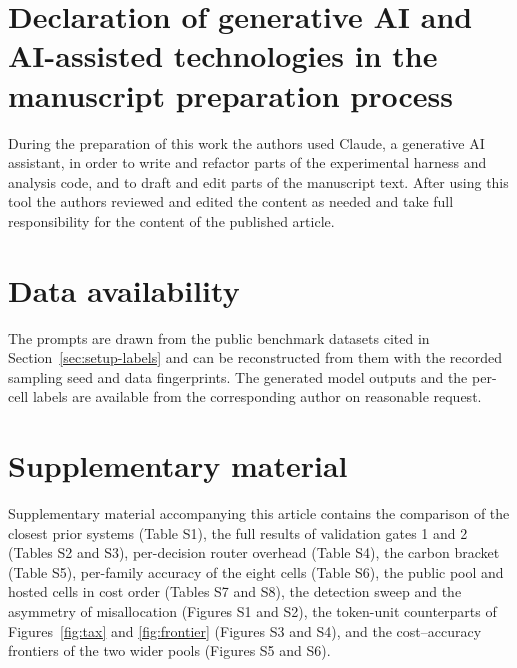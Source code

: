 
\section*{Declaration of generative AI and AI-assisted technologies in the
manuscript preparation process}

During the preparation of this work the authors used Claude, a generative AI
assistant, in order to write and refactor parts of the experimental harness
and analysis code, and to draft and edit parts of the manuscript text. After
using this tool the authors reviewed and edited the content as needed and
take full responsibility for the content of the published article.

\section*{Data availability}

The prompts are drawn from the public benchmark datasets cited in
Section~\ref{sec:setup-labels} and can be reconstructed from them with the
recorded sampling seed and data fingerprints. The generated model outputs
and the per-cell labels are available from the corresponding author on
reasonable request.

\section*{Supplementary material}

Supplementary material accompanying this article contains the comparison of
the closest prior systems (Table S1), the full results of validation gates 1
and 2 (Tables S2 and S3), per-decision router overhead (Table S4), the carbon
bracket (Table S5), per-family accuracy of the eight cells (Table S6), the
public pool and hosted cells in cost order (Tables S7 and S8), the detection
sweep and the asymmetry of misallocation (Figures S1 and S2), the token-unit
counterparts of Figures~\ref{fig:tax} and \ref{fig:frontier} (Figures S3 and
S4), and the cost--accuracy frontiers of the two wider pools (Figures S5 and
S6).
